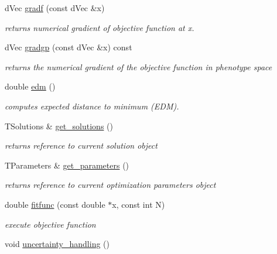 \begin{DoxyCompactItemize}
d\+Vec \hyperlink{classlibcmaes_1_1ESOStrategy_a43bd0b30c43445bc4ee2257963eebf47}{gradf} (const d\+Vec \&x)
\begin{DoxyCompactList}\small\item\em returns numerical gradient of objective function at x. \end{DoxyCompactList}\item 
d\+Vec \hyperlink{classlibcmaes_1_1ESOStrategy_a8a0581ead7ca7fac1f414c92ed030317}{gradgp} (const d\+Vec \&x) const 
\begin{DoxyCompactList}\small\item\em returns the numerical gradient of the objective function in phenotype space \end{DoxyCompactList}\item 
double \hyperlink{classlibcmaes_1_1ESOStrategy_a6350c635353e7b54e78abb223a5d4029}{edm} ()
\begin{DoxyCompactList}\small\item\em computes expected distance to minimum (E\+D\+M). \end{DoxyCompactList}\item 
T\+Solutions \& \hyperlink{classlibcmaes_1_1ESOStrategy_a0efc59c0fb25005207381cd3c45cb778}{get\+\_\+solutions} ()
\begin{DoxyCompactList}\small\item\em returns reference to current solution object \end{DoxyCompactList}\item 
T\+Parameters \& \hyperlink{classlibcmaes_1_1ESOStrategy_a6941ee6debca9ce43fb56eea7206ea33}{get\+\_\+parameters} ()
\begin{DoxyCompactList}\small\item\em returns reference to current optimization parameters object \end{DoxyCompactList}\item 
double \hyperlink{classlibcmaes_1_1ESOStrategy_a2763e44feed5c7635338fedaecb83e23}{fitfunc} (const double $\ast$x, const int N)
\begin{DoxyCompactList}\small\item\em execute objective function \end{DoxyCompactList}\item 
\hypertarget{classlibcmaes_1_1ESOStrategy_a44ba5db44668ae752aa9d1050784989d}{void \hyperlink{classlibcmaes_1_1ESOStrategy_a44ba5db44668ae752aa9d1050784989d}{uncertainty\+\_\+handling} ()}\label{classlibcmaes_1_1ESOStrategy_a44ba5db44668ae752aa9d1050784989d}


\end{DoxyCompactItemize}
